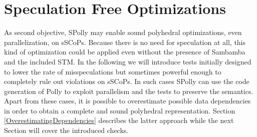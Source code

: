




\section{Speculation Free Optimizations}
\label{SpeculationFreesSCoPs}
\label{SpeculationFreeOptimizations}
As second objective, SPolly may enable sound polyhedral optimizations, even
parallelization, on sSCoPs. Because there is no need for speculation at all, this
kind of optimization could be applied even without the presence of Sambamba and 
the included STM.
In the following we will introduce tests initially designed to lower the rate 
of misspeculations but sometimes powerful enough to completely rule out violations
on sSCoPs. In such cases SPolly can use the code generation of Polly to 
exploit parallelism and the tests to preserve the semantics. Apart from these cases,
it is possible to overestimate possible data dependencies in order to obtain a
complete and sound polyhedral representation. Section \ref{OverestimatingDependencies}
describes the latter approach while the next Section will cover the introduced checks.

